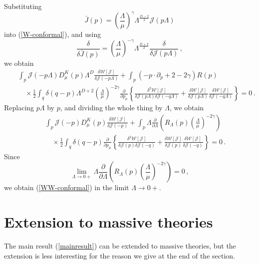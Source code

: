 \documentclass[aps,prd,preprint,groupedaddress,preprintnumbers,longbibliography]{revtex4-1}
\newcommand{\nn}{\nonumber}
\newcommand{\lb}{\left\lbrace}
\newcommand{\rb}{\right\rbrace}
\newcommand{\WW}{\mathcal{W}}
\newcommand{\JJ}{\mathcal{J}}
\begin{document}
Substituting
\begin{equation}
\bar{J} (p) = \left(\frac{\Lambda}{\mu}\right)^\gamma
\Lambda^{\frac{D-2}{2}} \JJ (p \Lambda)
\end{equation}
into (\ref{W-conformal}), and using
\begin{equation}
\frac{\delta}{\delta \bar{J} (p)} =
\left(\frac{\Lambda}{\mu}\right)^{-\gamma} \Lambda^{\frac{D+2}{2}}
\frac{\delta}{\delta \JJ (p \Lambda)}\,,
\end{equation}
we obtain
\begin{eqnarray}
&&\int_p \JJ (-p\Lambda) D_\mu^K (p) \Lambda^D \frac{\delta \WW
  [\JJ]}{\delta \JJ (- p \Lambda)} + \int_p \left( - p
  \cdot \partial_p + 2 - 2\gamma \right) R(p)\nn\\
&&\quad \times \frac{1}{2} \int_q \delta (q-p)
\Lambda^{D+2} \left(\frac{\Lambda}{\mu}\right)^{-2\gamma}
\frac{\partial}{\partial p_\mu} \lb
\frac{\delta^2 \WW [\JJ]}{\delta \JJ (p \Lambda) \delta \JJ (-q
  \Lambda)} + \frac{\delta \WW [\JJ]}{\delta \JJ (p \Lambda)}
\frac{\delta \WW [\JJ]}{\delta \JJ (- q\Lambda)} \rb = 0\,.
\end{eqnarray}
Replacing $p\Lambda$ by $p$, and dividing the whole thing by $\Lambda$, we
obtain
\begin{eqnarray}
&&\int_p \JJ (-p) D_\mu^K (p) \frac{\delta \WW [\JJ]}{\delta \JJ
  (-p)}
+ \int_p \Lambda \frac{\partial}{\partial \Lambda} \left(
R_\Lambda (p) \left(\frac{\Lambda}{\mu}\right)^{-2\gamma}\right)\nn\\ 
&&\quad \times \frac{1}{2} \int_q \delta (q-p)
 \frac{\partial}{\partial
  p_\mu}
\lb \frac{\delta^2 \WW [\JJ]}{\delta \JJ (p) \delta \JJ (-q)} +
\frac{\delta \WW [\JJ]}{\delta \JJ (p)} 
\frac{\delta \WW [\JJ]}{\delta \JJ (- q)} \rb = 0\,.
\end{eqnarray}
Since
\begin{equation}
\lim_{\Lambda \to 0+} \Lambda \frac{\partial}{\partial \Lambda} \left(
R_\Lambda (p) \left(\frac{\Lambda}{\mu}\right)^{-2\gamma}\right) =
0\,,
\end{equation}
we obtain (\ref{WW-conformal}) in the limit $\Lambda \to 0+$.


\section{Extension to massive theories\label{section-massive}}

The main result (\ref{mainresult}) can be extended to massive
theories, but the extension is less interesting for the reason we give
at the end of the section.
\end{document}
